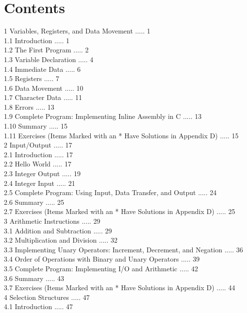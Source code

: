 \documentclass[10pt]{article}
\begin{document}
\section*{Contents}
1 Variables, Registers, and Data Movement ..... 1\\
1.1 Introduction ..... 1\\
1.2 The First Program ..... 2\\
1.3 Variable Declaration ..... 4\\
1.4 Immediate Data ..... 6\\
1.5 Registers ..... 7\\
1.6 Data Movement ..... 10\\
1.7 Character Data ..... 11\\
1.8 Errors ..... 13\\
1.9 Complete Program: Implementing Inline Assembly in C ..... 13\\
1.10 Summary ..... 15\\
1.11 Exercises (Items Marked with an * Have Solutions in Appendix D) ..... 15\\
2 Input/Output ..... 17\\
2.1 Introduction ..... 17\\
2.2 Hello World ..... 17\\
2.3 Integer Output ..... 19\\
2.4 Integer Input ..... 21\\
2.5 Complete Program: Using Input, Data Transfer, and Output ..... 24\\
2.6 Summary ..... 25\\
2.7 Exercises (Items Marked with an * Have Solutions in Appendix D) ..... 25\\
3 Arithmetic Instructions ..... 29\\
3.1 Addition and Subtraction ..... 29\\
3.2 Multiplication and Division ..... 32\\
3.3 Implementing Unary Operators: Increment, Decrement, and Negation ..... 36\\
3.4 Order of Operations with Binary and Unary Operators ..... 39\\
3.5 Complete Program: Implementing I/O and Arithmetic ..... 42\\
3.6 Summary ..... 43\\
3.7 Exercises (Items Marked with an * Have Solutions in Appendix D) ..... 44\\
4 Selection Structures ..... 47\\
4.1 Introduction ..... 47\\
\end{document}
